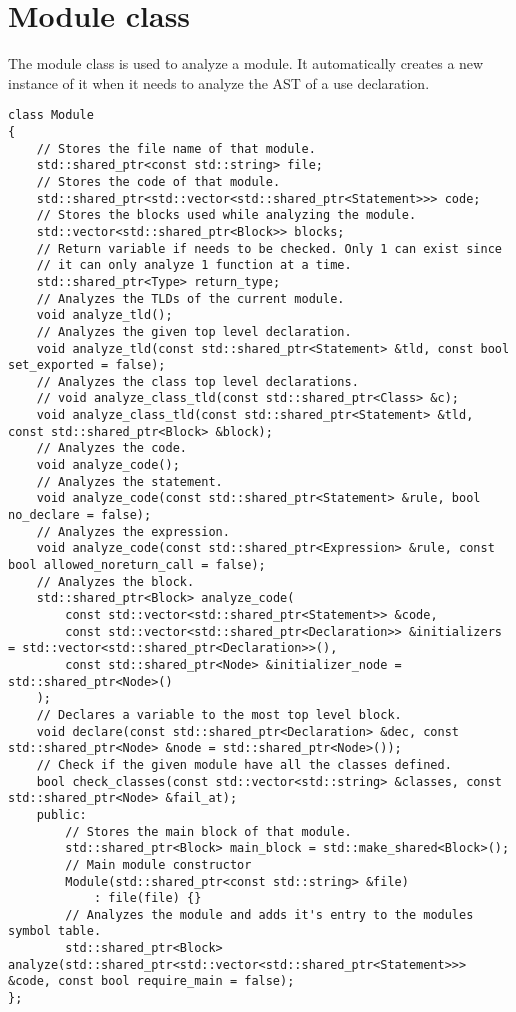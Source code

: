 \section{Module class}

The module class is used to analyze a module. It automatically creates a new instance of it when it needs to analyze
the AST of a use declaration.\\

\begin{code}
\begin{verbatim}
class Module
{
    // Stores the file name of that module.
    std::shared_ptr<const std::string> file;
    // Stores the code of that module.
    std::shared_ptr<std::vector<std::shared_ptr<Statement>>> code;
    // Stores the blocks used while analyzing the module.
    std::vector<std::shared_ptr<Block>> blocks;
    // Return variable if needs to be checked. Only 1 can exist since
    // it can only analyze 1 function at a time.
    std::shared_ptr<Type> return_type;
    // Analyzes the TLDs of the current module.
    void analyze_tld();
    // Analyzes the given top level declaration.
    void analyze_tld(const std::shared_ptr<Statement> &tld, const bool set_exported = false);
    // Analyzes the class top level declarations.
    // void analyze_class_tld(const std::shared_ptr<Class> &c);
    void analyze_class_tld(const std::shared_ptr<Statement> &tld, const std::shared_ptr<Block> &block);
    // Analyzes the code.
    void analyze_code();
    // Analyzes the statement.
    void analyze_code(const std::shared_ptr<Statement> &rule, bool no_declare = false);
    // Analyzes the expression.
    void analyze_code(const std::shared_ptr<Expression> &rule, const bool allowed_noreturn_call = false);
    // Analyzes the block.
    std::shared_ptr<Block> analyze_code(
        const std::vector<std::shared_ptr<Statement>> &code,
        const std::vector<std::shared_ptr<Declaration>> &initializers = std::vector<std::shared_ptr<Declaration>>(),
        const std::shared_ptr<Node> &initializer_node = std::shared_ptr<Node>()
    );
    // Declares a variable to the most top level block.
    void declare(const std::shared_ptr<Declaration> &dec, const std::shared_ptr<Node> &node = std::shared_ptr<Node>());
    // Check if the given module have all the classes defined.
    bool check_classes(const std::vector<std::string> &classes, const std::shared_ptr<Node> &fail_at);
    public:
        // Stores the main block of that module.
        std::shared_ptr<Block> main_block = std::make_shared<Block>();
        // Main module constructor
        Module(std::shared_ptr<const std::string> &file)
            : file(file) {}
        // Analyzes the module and adds it's entry to the modules symbol table.
        std::shared_ptr<Block> analyze(std::shared_ptr<std::vector<std::shared_ptr<Statement>>> &code, const bool require_main = false);
};
\end{verbatim}
\end{code}


